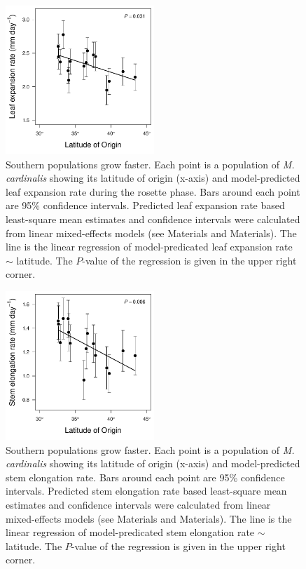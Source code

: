 \documentclass[11pt, oneside]{article}
\begin{document}
\begin{figure}[h!]
	\centerline{\includegraphics[width=0.5\textwidth]{Figures/FigureS_LERlat.pdf}}
	\fontsize{10}{12}
	\selectfont
	\caption[Southern populations grow faster (leaf expansion rate).]{Southern populations grow faster. Each point is a population of \textit{M. cardinalis} showing its latitude of origin (x-axis) and model-predicted leaf expansion rate during the rosette phase. Bars around each point are 95\% confidence intervals. Predicted leaf expansion rate based least-square mean estimates and confidence intervals were calculated from linear mixed-effects models (see Materials and Materials). The line is the linear regression of model-predicated leaf expansion rate $\sim$ latitude. The $P$-value of the regression is given in the upper right corner.}
	\label{fig:FigS_LERlat}
\end{figure}


\begin{figure}[h!]
	\centerline{\includegraphics[width=0.5\textwidth]{Figures/FigureS_SERlat.pdf}}
	\fontsize{10}{12}
	\selectfont
	\caption[Southern populations grow faster (stem elongation rate).]{Southern populations grow faster. Each point is a population of \textit{M. cardinalis} showing its latitude of origin (x-axis) and model-predicted stem elongation rate. Bars around each point are 95\% confidence intervals. Predicted stem elongation rate based least-square mean estimates and confidence intervals were calculated from linear mixed-effects models (see Materials and Materials). The line is the linear regression of model-predicated stem elongation rate $\sim$ latitude. The $P$-value of the regression is given in the upper right corner.}
	\label{fig:FigS_SERlat}
\end{figure}
\end{document}
